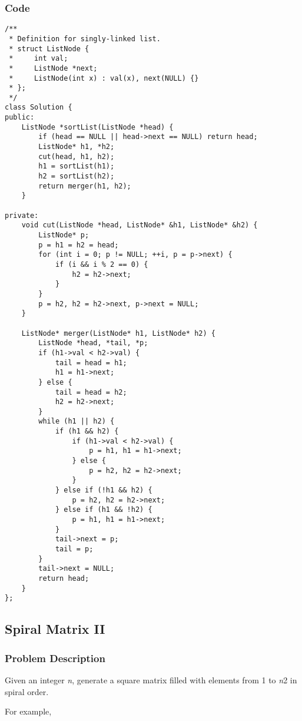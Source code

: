 \documentclass{article}
\begin{document}
\begin{CJK*}{UTF8}{gkai}
\subsubsection*{Code}
\begin{lstlisting}
/**
 * Definition for singly-linked list.
 * struct ListNode {
 *     int val;
 *     ListNode *next;
 *     ListNode(int x) : val(x), next(NULL) {}
 * };
 */
class Solution {
public:
    ListNode *sortList(ListNode *head) {
        if (head == NULL || head->next == NULL) return head;
        ListNode* h1, *h2;
        cut(head, h1, h2);
        h1 = sortList(h1);
        h2 = sortList(h2);
        return merger(h1, h2);
    }
    
private:
    void cut(ListNode *head, ListNode* &h1, ListNode* &h2) {
        ListNode* p;
        p = h1 = h2 = head;
        for (int i = 0; p != NULL; ++i, p = p->next) {
            if (i && i % 2 == 0) {
                h2 = h2->next;
            }
        }
        p = h2, h2 = h2->next, p->next = NULL;
    }
    
    ListNode* merger(ListNode* h1, ListNode* h2) {
        ListNode *head, *tail, *p;
        if (h1->val < h2->val) {
            tail = head = h1;
            h1 = h1->next;
        } else {
            tail = head = h2;
            h2 = h2->next;
        }
        while (h1 || h2) {
            if (h1 && h2) {
                if (h1->val < h2->val) {
                    p = h1, h1 = h1->next;
                } else {
                    p = h2, h2 = h2->next;
                }
            } else if (!h1 && h2) {
                p = h2, h2 = h2->next;
            } else if (h1 && !h2) {
                p = h1, h1 = h1->next;
            }
            tail->next = p;
            tail = p;
        }
        tail->next = NULL;
        return head;
    }
}; 
\end{lstlisting}


\subsection{ Spiral Matrix II }
\label{ Spiral Matrix II }

\subsubsection*{Problem Description}
Given an integer \emph{n}, generate a square matrix filled with elements from 1 to \emph{n}2 in spiral order.

For example,



\end{CJK*}
\end{document}
